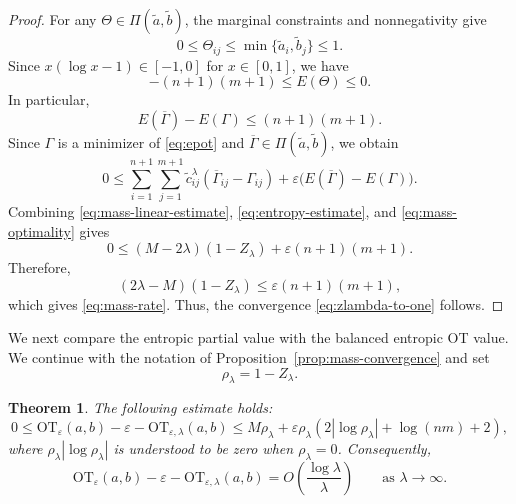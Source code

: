 \documentclass[a4paper,11pt]{article}
\numberwithin{equation}{section}
\newtheorem{thm}{Theorem}[section]
\newcommand{\eps}{\varepsilon}
\newcommand{\OT}{\mathrm{OT}}
\begin{document}
\begin{proof}
For any $\Theta\in\Pi(\widetilde a,\widetilde b)$, the marginal constraints and nonnegativity give
\begin{equation*}
  0 \leq \Theta_{ij} \leq \min\{\widetilde a_i,\widetilde b_j\} \leq 1.
\end{equation*}
Since $x(\log x-1) \in[-1,0]$ for $x\in[0,1]$, we have
\begin{equation*}
  -(n+1)(m+1) \leq E(\Theta) \leq 0.
\end{equation*}
In particular,
\begin{equation}\label{eq:entropy-estimate}
  E(\overline\Gamma)-E(\Gamma) \leq (n + 1)(m + 1).
\end{equation}
Since $\Gamma$ is a minimizer of \eqref{eq:epot} and $\overline\Gamma\in\Pi(\widetilde a,\widetilde b)$, we obtain
\begin{equation}\label{eq:mass-optimality}
  0 \leq \sum_{i = 1}^{n + 1}\sum_{j = 1}^{m + 1}\widetilde c^\lambda_{ij}(\overline\Gamma_{ij}-\Gamma_{ij}) + \eps\bigl(E(\overline\Gamma)-E(\Gamma)\bigr).
\end{equation}
Combining \eqref{eq:mass-linear-estimate}, \eqref{eq:entropy-estimate}, and \eqref{eq:mass-optimality} gives
\begin{equation*}
  0 \leq (M-2\lambda)(1-Z_{\lambda})+\eps(n+1)(m+1).
\end{equation*}
Therefore,
\begin{equation*}
  (2\lambda-M)(1-Z_{\lambda}) \leq \eps(n+1)(m+1),
\end{equation*}
which gives \eqref{eq:mass-rate}. Thus, the convergence \eqref{eq:zlambda-to-one} follows.
\end{proof}

We next compare the entropic partial value with the balanced entropic OT value. We continue with the notation of Proposition~\ref{prop:mass-convergence} and set
\begin{equation*}
  \rho_{\lambda}=1-Z_{\lambda}.
\end{equation*}

\begin{thm}\label{thm:value-error-estimate}
The following estimate holds: 
\begin{equation}\label{eq:value-error-estimate}
  0 \leq \OT_{\eps}(a,b)-\eps-\OT_{\eps,\lambda}(a,b) \leq M\rho_{\lambda} + \eps\rho_{\lambda}\left(2|\log\rho_{\lambda}| + \log(nm) + 2\right),
\end{equation}
where $\rho_{\lambda}|\log\rho_{\lambda}|$ is understood to be zero when $\rho_{\lambda}=0$. Consequently,
\begin{equation*}
  \OT_{\eps}(a,b)-\eps-\OT_{\eps,\lambda}(a,b) = O\left(\frac{\log\lambda}{\lambda}\right) \qquad\text{as }\lambda\to\infty.
\end{equation*}
\end{thm}
\end{document}
